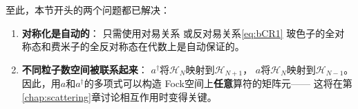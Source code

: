 \medskip

至此，本节开头的两个问题都已解决：

\begin{enumerate}
\item \textbf{对称化是自动的}：
      只需使用对易关系
      或反对易关系\eqref{eq:bCR1}
      玻色子的全对称态和费米子的全反对称态在代数上是自动保证的。

\item \textbf{不同粒子数空间被联系起来}：
      $a^\dagger$将$\mathscr{H}_N$映射到$\mathscr{H}_{N+1}$，
      $a$将$\mathscr{H}_N$映射到$\mathscr{H}_{N-1}$。
      因此，用$a$和$a^\dagger$的多项式可以构造
      Fock空间上\textbf{任意}算符的矩阵元——
      这将在第\ref{chap:scattering}章讨论相互作用时变得关键。
      \end{enumerate}